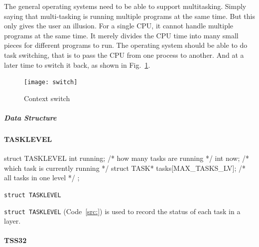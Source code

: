 \documentclass{swfcthesis}
\begin{document}
The general operating systems need to be able to support multitasking. Simply saying that
multi-tasking is running multiple programs at the same time. But this only gives the user
an illusion. For a single CPU, it cannot handle multiple programs at the same time. It
merely divides the CPU time into many small pieces for different programs to run. The
operating system should be able to do task switching, that is to pass the CPU from one
process to another. And at a later time to switch it back, as shown in
Fig.~\ref{fig:ctxt-switch}. 

\begin{figure}
  \centering
  \begin{center}
    \texttt{[image: switch]}
  \end{center}
  \caption{Context switch}
  \label{fig:ctxt-switch}
\end{figure}

\subparagraph{Data Structure}


\paragraph{TASKLEVEL}

\begin{listing}[H]
  \begin{codeblock}
\begin{ccode}
struct TASKLEVEL
{ 
  int running;                      /* how many tasks are running */
  int now;                          /* which task is currently running */
  struct TASK* tasks[MAX_TASKS_LV]; /* all tasks in one level */
};
\end{ccode}
  \end{codeblock}
  \caption{\texttt{struct TASKLEVEL}}\label{src:TASKLEVEL}
\end{listing}

\texttt{struct TASKLEVEL} (Code~\ref{src:}) is used to record the status of each task in a
layer.


\paragraph{TSS32}
\end{document}
